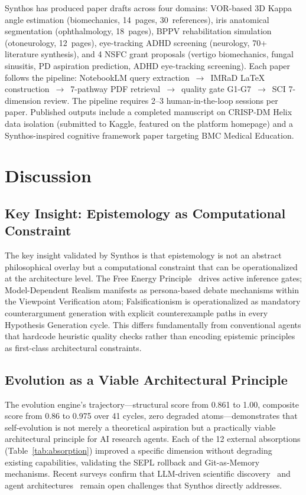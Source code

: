 \documentclass[review]{elsarticle}
\begin{document}
Synthos has produced paper drafts across four domains: VOR-based 3D Kappa angle estimation (biomechanics, 14~pages, 30~references), iris anatomical segmentation (ophthalmology, 18~pages), BPPV rehabilitation simulation (otoneurology, 12~pages), eye-tracking ADHD screening (neurology, 70+ literature synthesis), and 4 NSFC grant proposals (vertigo biomechanics, fungal sinusitis, PD aspiration prediction, ADHD eye-tracking screening). Each paper follows the pipeline: NotebookLM query extraction~$\rightarrow$~IMRaD LaTeX construction~$\rightarrow$~7-pathway PDF retrieval~$\rightarrow$~quality gate G1-G7~$\rightarrow$~SCI 7-dimension review. The pipeline requires 2--3 human-in-the-loop sessions per paper. Published outputs include a completed manuscript on CRISP-DM Helix data isolation (submitted to Kaggle, featured on the platform homepage) and a Synthos-inspired cognitive framework paper targeting BMC Medical Education.

\section{Discussion}

\subsection{Key Insight: Epistemology as Computational Constraint}

The key insight validated by Synthos is that epistemology is not an abstract philosophical overlay but a computational constraint that can be operationalized at the architecture level. The Free Energy Principle~\cite{friston2010free} drives active inference gates; Model-Dependent Realism manifests as persona-based debate mechanisms within the Viewpoint Verification atom; Falsificationism is operationalized as mandatory counterargument generation with explicit counterexample paths in every Hypothesis Generation cycle. This differs fundamentally from conventional agents that hardcode heuristic quality checks rather than encoding epistemic principles as first-class architectural constraints.

\subsection{Evolution as a Viable Architectural Principle}

The evolution engine's trajectory---structural score from 0.861 to 1.00, composite score from 0.86 to 0.975 over 41 cycles, zero degraded atoms---demonstrates that self-evolution is not merely a theoretical aspiration but a practically viable architectural principle for AI research agents. Each of the 12 external absorptions (Table~\ref{tab:absorption}) improved a specific dimension without degrading existing capabilities, validating the SEPL rollback and Git-as-Memory mechanisms. Recent surveys confirm that LLM-driven scientific discovery~\cite{gao2024scientific} and agent architectures~\cite{wang2024surveyagent,xi2023rise} remain open challenges that Synthos directly addresses.
\end{document}
